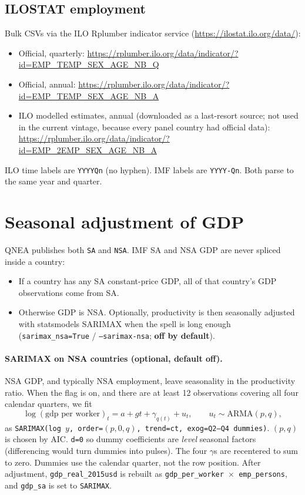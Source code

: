 \documentclass[11pt]{article}
\begin{document}
\subsection{ILOSTAT employment}

Bulk CSVs via the ILO Rplumber indicator service
(\url{https://ilostat.ilo.org/data/}):

\begin{itemize}
\item Official, quarterly:
\url{https://rplumber.ilo.org/data/indicator/?id=EMP_TEMP_SEX_AGE_NB_Q}
\item Official, annual:
\url{https://rplumber.ilo.org/data/indicator/?id=EMP_TEMP_SEX_AGE_NB_A}
\item ILO modelled estimates, annual (downloaded as a last-resort source; not
used in the current vintage, because every panel country had official data):
\url{https://rplumber.ilo.org/data/indicator/?id=EMP_2EMP_SEX_AGE_NB_A}
\end{itemize}

ILO time labels are \texttt{YYYYQn} (no hyphen). IMF labels are
\texttt{YYYY-Qn}. Both parse to the same year and quarter.

\section{Seasonal adjustment of GDP}

QNEA publishes both \texttt{SA} and \texttt{NSA}. IMF SA and NSA GDP are
never spliced inside a country:

\begin{itemize}
\item If a country has any SA constant-price GDP, all of that country's GDP
observations come from SA.
\item Otherwise GDP is NSA. Optionally, productivity is then seasonally
adjusted with statsmodels SARIMAX when the spell is long enough
(\texttt{sarimax\_nsa=True} / \texttt{--sarimax-nsa}; \textbf{off by default}).
\end{itemize}

\paragraph{SARIMAX on NSA countries (optional, default off).}
NSA GDP, and typically NSA employment, leave seasonality in the productivity
ratio. When the flag is on, and there are at least 12 observations covering
all four calendar quarters, we fit
\begin{equation}
\log(\text{gdp per worker})_{t}
=
a + g t + \gamma_{q(t)} + u_{t},
\qquad
u_{t}\sim\mathrm{ARMA}(p,q),
\end{equation}
as \texttt{SARIMAX(log $y$, order=$(p,0,q)$, trend=ct, exog=Q2--Q4 dummies)}.
$(p,q)$ is chosen by AIC. \texttt{d=0} so dummy coefficients are
\emph{level} seasonal factors (differencing would turn dummies into pulses).
The four $\gamma$s are recentered to sum to zero. Dummies use the calendar
quarter, not the row position. After adjustment,
\texttt{gdp\_real\_2015usd} is rebuilt as
\texttt{gdp\_per\_worker $\times$ emp\_persons}, and \texttt{gdp\_sa} is set
to \texttt{SARIMAX}.
\end{document}
